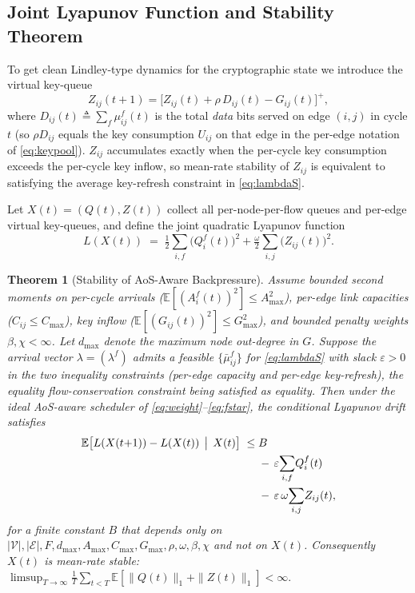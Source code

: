 \documentclass[conference]{IEEEtran}
\newtheorem{theorem}{Theorem}
\begin{document}
\subsection{Joint Lyapunov Function and Stability Theorem}
\label{sec:thm}

To get clean Lindley-type dynamics for the cryptographic state we
introduce the virtual key-queue
\begin{equation}
Z_{ij}(t{+}1)
 = \bigl[Z_{ij}(t) + \rho\,D_{ij}(t) - G_{ij}(t)\bigr]^{+},
\label{eq:vqueue}
\end{equation}
where $D_{ij}(t)\triangleq\sum_f\mu^f_{ij}(t)$ is the total
\emph{data} bits served on edge $(i,j)$ in cycle $t$ (so
$\rho D_{ij}$ equals the key consumption $U_{ij}$ on that edge in
the per-edge notation of \eqref{eq:keypool}).  $Z_{ij}$ accumulates
exactly when the per-cycle key consumption exceeds the per-cycle key
inflow, so mean-rate stability of $Z_{ij}$ is equivalent to
satisfying the average key-refresh constraint in
\eqref{eq:lambdaS}.

Let $X(t)=(Q(t),Z(t))$ collect all per-node-per-flow queues and
per-edge virtual key-queues, and define the joint quadratic
Lyapunov function
\begin{equation}
L(X(t))
 \;=\; \tfrac{1}{2}\!\sum_{i,f}\!\bigl(Q^f_i(t)\bigr)^2
     + \tfrac{\omega}{2}\!\sum_{i,j}\!\bigl(Z_{ij}(t)\bigr)^2.
\label{eq:lyapunov}
\end{equation}

\begin{theorem}[Stability of AoS-Aware Backpressure]
\label{thm:stab}
Assume bounded second moments on per-cycle arrivals
($\mathbb{E}[(A^f_i(t))^2]\!\le\!A_{\max}^2$), per-edge link
capacities ($C_{ij}\!\le\!C_{\max}$), key inflow
($\mathbb{E}[(G_{ij}(t))^2]\!\le\!G_{\max}^2$), and bounded penalty
weights $\beta,\chi<\infty$.  Let $d_{\max}$ denote the maximum node
out-degree in $G$.  Suppose the arrival vector
$\lambda=(\lambda^f)$ admits a feasible $\{\bar\mu^f_{ij}\}$ for
\eqref{eq:lambdaS} with slack $\varepsilon>0$ in the two inequality
constraints (per-edge capacity and per-edge key-refresh), the
equality flow-conservation constraint being satisfied as equality.
Then under the ideal AoS-aware scheduler of
\eqref{eq:weight}--\eqref{eq:fstar}, the conditional Lyapunov drift
satisfies
\begin{equation}
\begin{split}
\mathbb{E}\!\left[L(X(t{+}1))-L(X(t))\,\bigm|\,X(t)\right]
 \;\le\;& B \\
 & -\,\varepsilon\!\sum_{i,f}\!Q^f_i(t)\\
 & -\,\varepsilon\,\omega\!\sum_{i,j}\!Z_{ij}(t),
\end{split}
\label{eq:drift}
\end{equation}
for a finite constant $B$ that depends only on
$|\mathcal{V}|,|\mathcal{E}|,F,d_{\max},A_{\max},C_{\max},G_{\max},
\rho,\omega,\beta,\chi$ and not on $X(t)$.  Consequently $X(t)$ is
mean-rate stable:
\(
\limsup_{T\to\infty}\tfrac{1}{T}\!\sum_{t<T}\!
\mathbb{E}\!\left[\|Q(t)\|_1+\|Z(t)\|_1\right] <\infty.
\)
\end{theorem}
\end{document}
